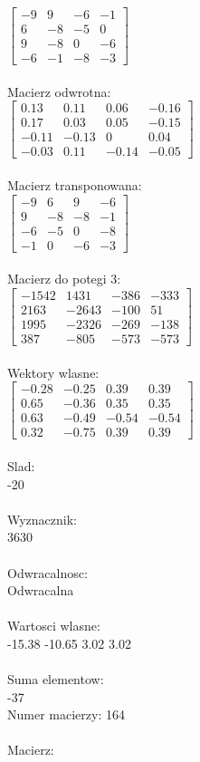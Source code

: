 \documentclass[a4paper,12pt]{article}
\begin{document}
$\begin{bmatrix} -9&9&-6&-1\\6&-8&-5&0\\9&-8&0&-6\\-6&-1&-8&-3 \end{bmatrix}$
\\
\\
Macierz odwrotna:\\

$\begin{bmatrix} 0.13&0.11&0.06&-0.16\\0.17&0.03&0.05&-0.15\\-0.11&-0.13&0&0.04\\-0.03&0.11&-0.14&-0.05 \end{bmatrix}$
\\
\\
Macierz transponowana:\\

$\begin{bmatrix} -9&6&9&-6\\9&-8&-8&-1\\-6&-5&0&-8\\-1&0&-6&-3 \end{bmatrix}$
\\
\\
Macierz do potegi 3:\\

$\begin{bmatrix} -1542&1431&-386&-333\\2163&-2643&-100&51\\1995&-2326&-269&-138\\387&-805&-573&-573 \end{bmatrix}$
\\
\\
Wektory wlasne:\\

$\begin{bmatrix} -0.28&-0.25&0.39&0.39\\0.65&-0.36&0.35&0.35\\0.63&-0.49&-0.54&-0.54\\0.32&-0.75&0.39&0.39 \end{bmatrix}$
\\
\\
Slad:\\
-20
\\
\\
Wyznacznik:\\
3630
\\
\\
Odwracalnosc:\\
Odwracalna
\\
\\
Wartosci wlasne:\\
-15.38 -10.65 3.02 3.02
\\
\\
Suma elementow:\\
-37
\\
\newpage
Numer macierzy:
164
\\
\\
Macierz:\\
\end{document}
